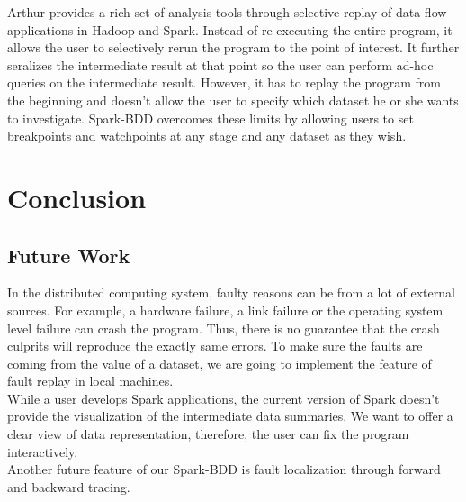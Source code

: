 \documentclass{acm_proc_article-sp}
\begin{document}
Arthur provides a rich set of analysis tools through selective replay of data flow applications in Hadoop and Spark. Instead of re-executing the entire program, it allows the user to selectively rerun the program to the point of interest. It further seralizes the intermediate result at that point so the user can perform ad-hoc queries on the intermediate result. However, it has to replay the program from the beginning and doesn't allow the user to specify which dataset he or she wants to investigate. Spark-BDD overcomes these limits by allowing users to set breakpoints and watchpoints at any stage and any dataset as they wish.

\section{Conclusion}

\subsection{Future Work}
In the distributed computing system, faulty reasons can be from a lot of external sources. For example, a hardware failure, a link failure or the operating system level failure can crash the program. Thus, there is no guarantee that the crash culprits will reproduce the exactly same errors. To make sure the faults are coming from the value of a dataset, we are going to implement the feature of fault replay in local machines.\\
While a user develops Spark applications, the current version of Spark doesn't provide the visualization of the intermediate data summaries. We want to offer a clear view of data representation, therefore, the user can fix the program interactively.\\
Another future feature of our Spark-BDD is fault localization through forward and backward tracing.


  
\balancecolumns
\end{document}
